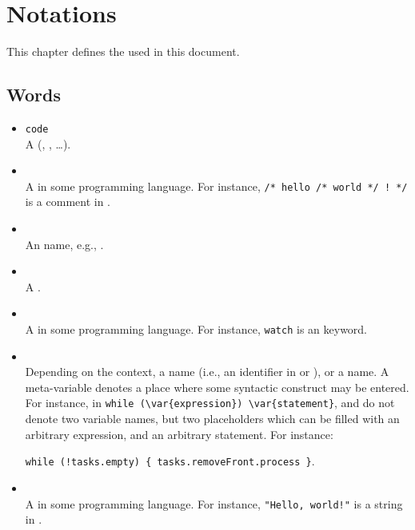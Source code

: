
\chapter{Notations}
\label{sec:notations}

This chapter defines the  used in this document.

\section{Words}

\begin{itemize}
\item \lstinline|code|\\
  A  (\us, \Java, \Cxx\ldots).

\item {}\\
  A  in some programming language.  For instance,
  \lstinline|/* hello /* world */ ! */| is a comment in \us.

\item {}\\
  An  name, e.g., .

\item {}\\
  A .

\item {}\\
  A  in some programming language.  For instance,
  \lstinline|watch| is an \us keyword.

\item {}\\
  Depending on the context, a  name (i.e., an identifier in
  \Cxx or \us), or a  name.  A meta-variable denotes a
  place where some syntactic construct may be entered.  For instance, in
  \lstinline|while (\var{expression}) \var{statement}|,  and
   do not denote two variable names, but two placeholders
  which can be filled with an arbitrary expression, and an arbitrary
  statement.  For instance:

  \lstinline|while (!tasks.empty) { tasks.removeFront.process }|.

\item {}\\
  A  in some programming language.  For instance,
  \lstinline|"Hello, world!"| is a string in \us.
\end{itemize}

